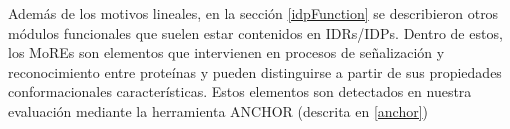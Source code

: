 


Además de los motivos lineales, en la sección \ref{idpFunction} se describieron otros módulos funcionales que suelen estar contenidos en IDRs/IDPs.
Dentro de estos, los MoREs son elementos que intervienen en procesos de señalización y reconocimiento entre proteínas y pueden distinguirse a partir de sus propiedades conformacionales características.  
Estos elementos son detectados en nuestra evaluación mediante la herramienta ANCHOR (descrita en \ref{anchor})

% 





